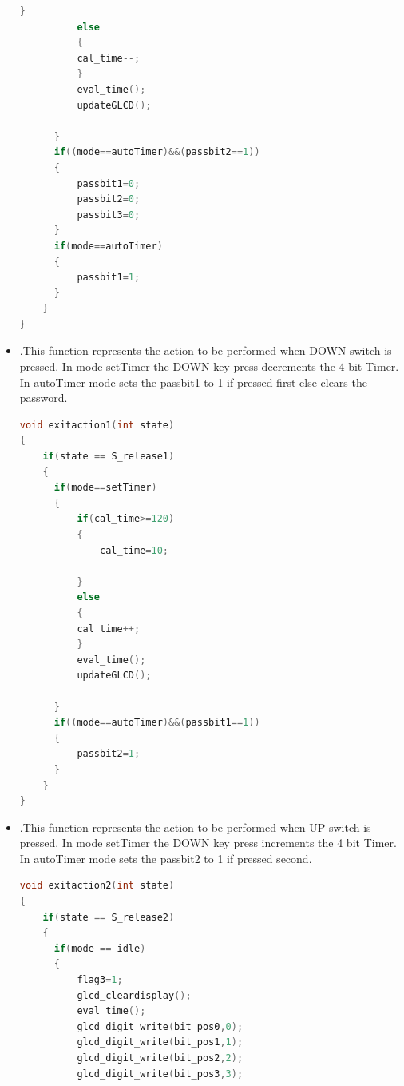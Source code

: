 \documentclass{article}
\begin{document}
\begin{itemize}
\begin{lstlisting}[basicstyle = \small, language = C]
          }
          else
          {
          cal_time--;
          }
          eval_time();
          updateGLCD();

      }
      if((mode==autoTimer)&&(passbit2==1))
      {
          passbit1=0;
          passbit2=0;
          passbit3=0;
      }
      if(mode==autoTimer)
      {
          passbit1=1;
      }
    }
}
  \end{lstlisting}
  \item {}.This function represents the action to be performed when DOWN switch is pressed. In mode setTimer the DOWN key press decrements the 4 bit Timer. In autoTimer mode sets the passbit1 to 1 if pressed first else clears the password.
      \begin{lstlisting}[basicstyle = \small, language = C]
void exitaction1(int state)
{
    if(state == S_release1)
    {
      if(mode==setTimer)
      {
          if(cal_time>=120)
          {
              cal_time=10;

          }
          else
          {
          cal_time++;
          }
          eval_time();
          updateGLCD();

      }
      if((mode==autoTimer)&&(passbit1==1))
      {
          passbit2=1;
      }
    }
}
  \end{lstlisting}
  \item {}.This function represents the action to be performed when UP switch is pressed. In mode setTimer the DOWN key press increments the 4 bit Timer. In autoTimer mode sets the passbit2 to 1 if pressed second. 
      \begin{lstlisting}[basicstyle = \small, language = C]
void exitaction2(int state)
{
    if(state == S_release2)
    {
      if(mode == idle)
      {
          flag3=1;
          glcd_cleardisplay();
          eval_time();
          glcd_digit_write(bit_pos0,0);
          glcd_digit_write(bit_pos1,1);
          glcd_digit_write(bit_pos2,2);
          glcd_digit_write(bit_pos3,3);


\end{lstlisting}
\end{itemize}
\end{document}
